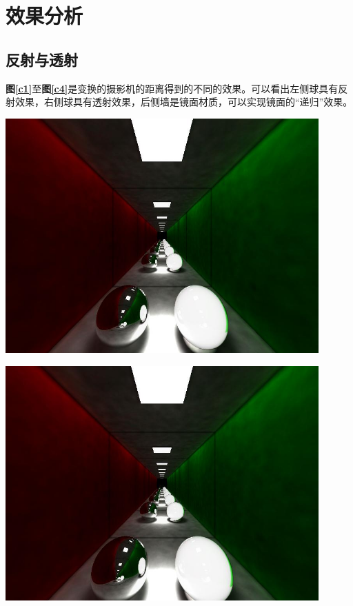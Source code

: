\documentclass[11pt, a4paper]{article}
\makeatletter
\newcommand\fcaption{\def\@captype{figure}\caption}
\newcommand{\fref}[1]{\textbf{图\ref{#1}}}
\makeatother
\begin{document}
\section{效果分析}

\subsection{反射与透射}

\fref{c1}至\fref{c4}是变换的摄影机的距离得到的不同的效果。可以看出左侧球具有反射效果，右侧球具有透射效果，后侧墙是镜面材质，可以实现镜面的“递归”效果。

\begin{center}
    \includegraphics[width=12cm]{../outputs/two_balls_1.jpeg}
    \fcaption{Two balls (fovy=50)}\label{c1}
\end{center}

\begin{center}
    \includegraphics[width=12cm]{../outputs/two_balls_2.jpeg}
    \fcaption{Two balls (fovy=48)}\label{c2}
\end{center}
\end{document}
